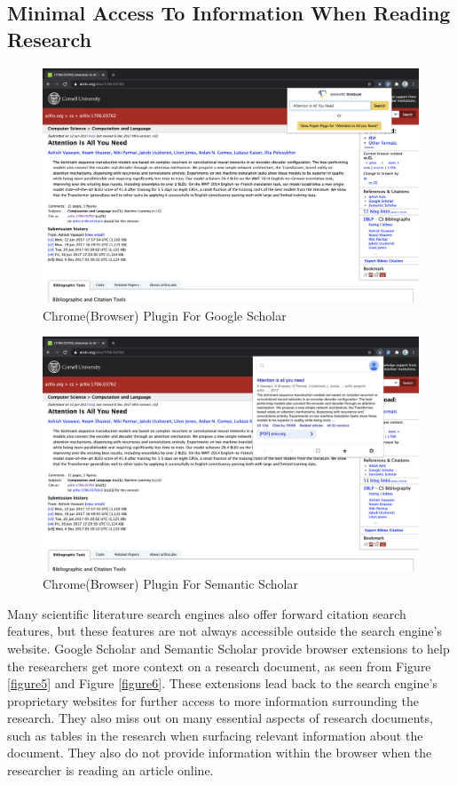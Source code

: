 \subsection{Minimal Access To Information When Reading Research}
\begin{figure}[h]
    \centering
    \includegraphics[width=\maxwidth{\textwidth}]{src/images/gg-plugin.png}
    \caption{Chrome(Browser) Plugin For Google Scholar}
    \label{figure\arabic{figurecounter}}
\end{figure}
\begin{figure}[h]
    \centering
    \includegraphics[width=\maxwidth{\textwidth}]{src/images/ss-plugin.png}
    \caption{Chrome(Browser) Plugin For Semantic Scholar}
    \label{figure\arabic{figurecounter}}
\end{figure}
Many scientific literature search engines also offer forward citation search features, but these features are not always accessible outside the search engine’s website. 
Google Scholar and Semantic Scholar provide browser extensions to help the researchers get more context on a research document, as seen from Figure \ref{figure5} and Figure \ref{figure6}. 
These extensions lead back to the search engine's proprietary websites for further access to more information surrounding the research. 
They also miss out on many essential aspects of research documents, such as tables in the research when surfacing relevant information about the document. 
They also do not provide information within the browser when the researcher is reading an article online. 
\pagebreak

